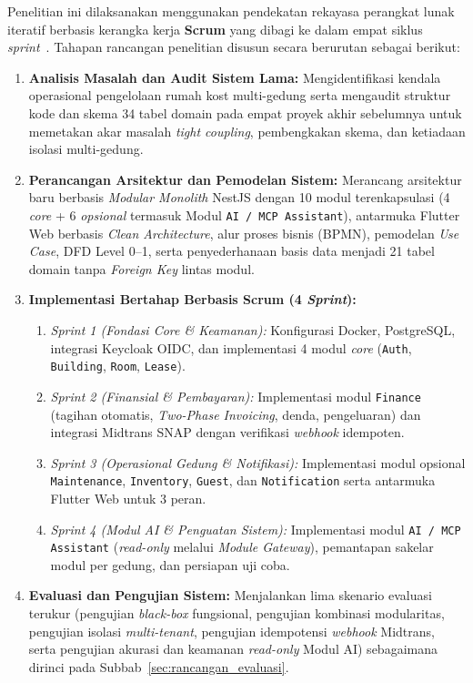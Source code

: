 Penelitian ini dilaksanakan menggunakan pendekatan rekayasa perangkat lunak iteratif berbasis kerangka kerja \textbf{Scrum} yang dibagi ke dalam empat siklus \textit{sprint}~\cite{schwaber2020}. Tahapan rancangan penelitian disusun secara berurutan sebagai berikut:
\begin{enumerate}[label=\arabic*., leftmargin=*]
  \item \textbf{Analisis Masalah dan Audit Sistem Lama:} Mengidentifikasi kendala operasional pengelolaan rumah kost multi-gedung serta mengaudit struktur kode dan skema 34 tabel domain pada empat proyek akhir sebelumnya untuk memetakan akar masalah \textit{tight coupling}, pembengkakan skema, dan ketiadaan isolasi multi-gedung.
  \item \textbf{Perancangan Arsitektur dan Pemodelan Sistem:} Merancang arsitektur baru berbasis \textit{Modular Monolith} NestJS dengan 10 modul terenkapsulasi (4 \textit{core} + 6 \textit{opsional} termasuk Modul \texttt{AI / MCP Assistant}), antarmuka Flutter Web berbasis \textit{Clean Architecture}, alur proses bisnis (BPMN), pemodelan \textit{Use Case}, DFD Level 0--1, serta penyederhanaan basis data menjadi 21 tabel domain tanpa \textit{Foreign Key} lintas modul.
  \item \textbf{Implementasi Bertahap Berbasis Scrum (4 \textit{Sprint}):}
    \begin{enumerate}[label=\alph*., leftmargin=*]
      \item \textit{Sprint 1 (Fondasi Core \& Keamanan):} Konfigurasi Docker, PostgreSQL, integrasi Keycloak OIDC, dan implementasi 4 modul \textit{core} (\texttt{Auth}, \texttt{Building}, \texttt{Room}, \texttt{Lease}).
      \item \textit{Sprint 2 (Finansial \& Pembayaran):} Implementasi modul \texttt{Finance} (tagihan otomatis, \textit{Two-Phase Invoicing}, denda, pengeluaran) dan integrasi Midtrans SNAP dengan verifikasi \textit{webhook} idempoten.
      \item \textit{Sprint 3 (Operasional Gedung \& Notifikasi):} Implementasi modul opsional \texttt{Maintenance}, \texttt{Inventory}, \texttt{Guest}, dan \texttt{Notification} serta antarmuka Flutter Web untuk 3 peran.
      \item \textit{Sprint 4 (Modul AI \& Penguatan Sistem):} Implementasi modul \texttt{AI / MCP Assistant} (\textit{read-only} melalui \textit{Module Gateway}), pemantapan sakelar modul per gedung, dan persiapan uji coba.
    \end{enumerate}
  \item \textbf{Evaluasi dan Pengujian Sistem:} Menjalankan lima skenario evaluasi terukur (pengujian \textit{black-box} fungsional, pengujian kombinasi modularitas, pengujian isolasi \textit{multi-tenant}, pengujian idempotensi \textit{webhook} Midtrans, serta pengujian akurasi dan keamanan \textit{read-only} Modul AI) sebagaimana dirinci pada Subbab~\ref{sec:rancangan_evaluasi}.
\end{enumerate}

